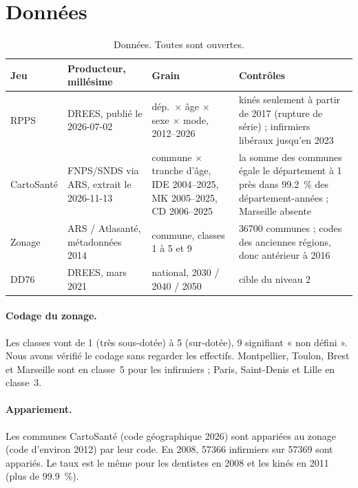 \section{Données}
\begin{table}[h]
\centering\small
\begin{tabular}{@{}p{3.2cm}p{3.6cm}p{2.3cm}p{5.2cm}@{}}
\toprule
Jeu & Producteur, millésime & Grain & Contrôles \\
\midrule
RPPS \citep{a3-drees2026demo} & DREES, publié le 2026-07-02 & dép.\ $\times$ âge $\times$ sexe $\times$ mode, 2012--2026 & kinés seulement à partir de 2017 (rupture de série) ; infirmiers libéraux jusqu'en 2023 \\
CartoSanté \citep{a3-cartosante2026} & FNPS/SNDS via ARS, extrait le 2026-11-13 & commune $\times$ tranche d'âge, IDE 2004--2025, MK 2005--2025, CD 2006--2025 & la somme des communes égale le département à 1 près dans \num{99.2}\mesure{}~\% des département-années ; Marseille absente \\
Zonage \citep{a3-atlasante2014zonage} & ARS / Atlasanté, métadonnées 2014 & commune, classes 1 à 5 et 9 & \num{36700}\mesure{} communes ; codes des anciennes régions, donc antérieur à 2016 \\
DD76 \citep{a3-drees2021dd76} & DREES, mars 2021 & national, 2030 / 2040 / 2050 & cible du niveau 2 \\
\bottomrule
\end{tabular}
\caption{Données. Toutes sont ouvertes.}
\end{table}

\paragraph{Codage du zonage.} Les classes vont de 1 (très sous-dotée) à 5 (sur-dotée), 9 signifiant
« non défini ». Nous avons vérifié le codage sans regarder les effectifs. Montpellier, Toulon, Brest
et Marseille sont en classe~5 pour les infirmiers ; Paris, Saint-Denis et Lille en classe~3.

\paragraph{Appariement.} Les communes CartoSanté (code géographique 2026) sont appariées au zonage
(code d'environ 2012) par leur code. En 2008, \num{57366}\mesure{} infirmiers sur
\num{57369}\mesure{} sont appariés. Le taux est le même pour les dentistes en 2008 et les kinés en
2011 (plus de \num{99.9}\derive{}~\%).

